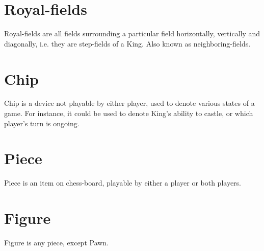 \section*{Royal-fields}
Royal-fields are all fields surrounding a particular field horizontally,
vertically and diagonally, i.e. they are step-fields of a King. Also known
as neighboring-fields.

\section*{Chip}
Chip is a device not playable by either player, used to denote various states
of a game. For instance, it could be used to denote King's ability to castle,
or which player's turn is ongoing.

\section*{Piece}
Piece is an item on chess-board, playable by either a player or both players.

\section*{Figure}
Figure is any piece, except Pawn.

\clearpage %
